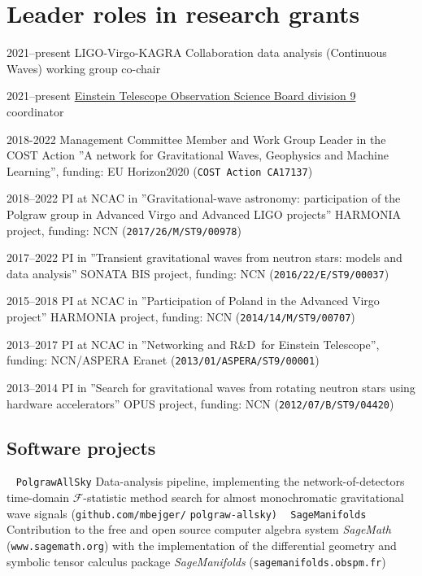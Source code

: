 \documentclass[]{friggeri-cv} %
\begin{document}
\section{Leader roles in research grants} 
\begin{entrylistoc}

\entrys 
{2021--present} 
{LIGO-Virgo-KAGRA Collaboration data analysis (Continuous Waves) working group co-chair} 

\entrys
{2021--present} 
{\href{https://indico.ego-gw.it/event/240/timetable/\#20210922}{Einstein Telescope Observation Science Board division 9} coordinator}

\entrys 
{2018-2022} 
{Management Committee Member and Work Group Leader in the COST Action ''A network for Gravitational Waves, Geophysics and Machine Learning'', funding: EU Horizon2020 ({\tt COST Action CA17137}) } 
   
\entrys
{2018--2022}
{PI at NCAC in ''Gravitational-wave astronomy: participation of the Polgraw group in Advanced Virgo and Advanced LIGO projects'' HARMONIA project, funding: NCN ({\tt 2017/26/M/ST9/00978})}

\entrys
{2017--2022} 
{PI in ''Transient gravitational waves from neutron stars: models and data analysis'' SONATA BIS project, funding: NCN ({\tt 2016/22/E/ST9/00037})} 

\entrys
{2015--2018} 
{PI at NCAC in ''Participation of Poland in the Advanced Virgo project'' HARMONIA project, funding: NCN ({\tt 2014/14/M/ST9/00707})} 

\entrys
{2013--2017}
{PI at NCAC in ''Networking and R\&D for Einstein Telescope'', funding: NCN/ASPERA Eranet ({\tt 2013/01/ASPERA/ST9/00001})}

\entrys
{2013--2014}
{PI in ''Search for gravitational waves from rotating neutron stars using hardware accelerators'' OPUS project, funding: NCN ({\tt 2012/07/B/ST9/04420})} 

\end{entrylistoc}

\pagebreak 
{} %

\pagebreak

\setlength{\voffset}{0pt}
\begin{aside}
\section{Software projects} 
~
{\tt PolgrawAllSky}
{Data-analysis pipeline, implementing the network-of-detectors time-domain $\mathcal{F}$-statistic method search for almost monochromatic gravitational wave signals ({\tt github.com/mbejger/}} 
{\tt polgraw-allsky)}
~
{\tt SageManifolds}
{Contribution to the free and open source computer algebra system {\it SageMath} ({\tt www.sagemath.org}) with the implementation of the differential geometry and symbolic tensor calculus package {\it SageManifolds} ({\tt sagemanifolds.obspm.fr})}
\end{aside}
\end{document}
